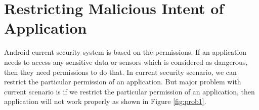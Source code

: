 \chapter{Restricting Malicious Intent of Application}
\label{ch:current}

\thispagestyle{empty}
Android current security system is based on the permissions. If an application needs to access any sensitive data or sensors which is considered as dangerous, then they need permissions to do that. In current security scenario, we can restrict the particular permission of an application. But major problem with current scenario is if we restrict the particular permission of an application, then application will not work properly as shown in Figure \ref{fig:prob1}.
